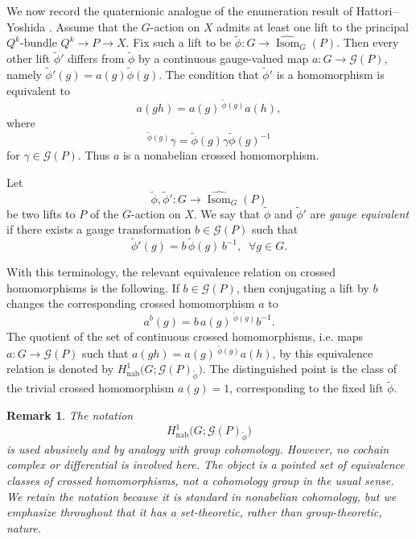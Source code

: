 \documentclass[11pt,a4paper]{article}
\numberwithin{equation}{section}
\newtheorem{remark}[definition]{Remark}
\theoremstyle{named}
\begin{document}
We now record the quaternionic analogue of the enumeration result of Hattori--Yoshida \cite[\S 4]{hatyos}. Assume that the \(G\)-action on \(X\) admits at least one lift to the principal \(Q^k\)-bundle $Q^k\longrightarrow P\longrightarrow X$.
Fix such a lift to be $\widetilde\phi:G\longrightarrow \widehat{\operatorname{Isom}}_G(P)$.
Then every other lift \(\widetilde\phi'\) differs from \(\widetilde\phi\) by a continuous gauge-valued map $a:G\longrightarrow \mathcal G(P)$,
namely $\widetilde\phi'(g)=a(g)\widetilde\phi(g)$.
The condition that \(\widetilde\phi'\) is a homomorphism is equivalent to
\[
a(gh)=a(g)\,{}^{\widetilde\phi(g)}a(h),
\]
where
\[
{}^{\widetilde\phi(g)}\gamma
=
\widetilde\phi(g)\gamma\widetilde\phi(g)^{-1}
\]
for \(\gamma\in\mathcal G(P)\). Thus \(a\) is a nonabelian crossed homomorphism. 

\begin{definition}
\label{def:gauge-equivalence-liftings}
Let
\[
\widetilde\phi,\widetilde\phi':
G\longrightarrow \widehat{\operatorname{Isom}}_G(P)
\]
be two lifts to $P$ of the \(G\)-action on \(X\). We say that \(\widetilde\phi\) and \(\widetilde\phi'\) are \emph{gauge equivalent} if there exists a gauge transformation \(b\in\mathcal G(P)\) such that
\[\widetilde\phi'(g) = b\,\widetilde\phi(g)\,b^{-1}
,\;\;\forall g\in G.\]
\end{definition}

\noindent With this terminology, the relevant equivalence relation on crossed homomorphisms is the following. If \(b\in\mathcal G(P)\), then conjugating a lift by \(b\) changes the corresponding crossed homomorphism \(a\) to
\[
a^b(g)
=
b\,a(g)\,{}^{\widetilde\phi(g)}b^{-1}.
\]
The quotient of the set of continuous crossed homomorphisms, i.e. maps $a:G\longrightarrow \mathcal G(P)$ such that $a(gh)=a(g)\,{}^{\widetilde\phi(g)}a(h)$, by this equivalence relation is denoted by $H^1_{\mathrm{nab}}\bigl(G;\mathcal G(P)_{\widetilde\phi}\bigr)$. The distinguished point is the class of the trivial crossed homomorphism \(a(g)=1\), corresponding to the fixed lift \(\widetilde\phi\).

\begin{remark}
\label{rem:nonabelian-H1-pointed-set}
The notation
\[
H^1_{\mathrm{nab}}
\bigl(G;\mathcal G(P)_{\widetilde\phi}\bigr)
\]
is used abusively and by analogy with group cohomology. However, no cochain complex or differential is involved here. The object is a pointed set of equivalence classes of crossed homomorphisms, not a cohomology group in the usual sense. We retain the notation because it is standard in nonabelian cohomology, but we emphasize throughout that it has a set-theoretic, rather than group-theoretic, nature.
\end{remark}
\end{document}
